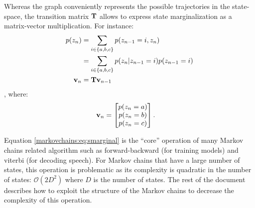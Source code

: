 Whereas the graph conveniently represents the possible trajectories in
the state-space, the transition matrix $\boldsymbol{\mathbf{T}}$ allows to express
state marginalization as a matrix-vector multiplication. For instance:
\begin{align}
    p(z_n) &= \sum_{i \in \{a, b, c\} } p(z_{n-1}=i, z_n) \\
    &= \sum_{i \in \{a, b, c\}} p(z_n | z_{n-1} = i) p(z_{n-1} = i) \\
    \boldsymbol{\mathbf{v}}_n &= \boldsymbol{\mathbf{T}} \boldsymbol{\mathbf{v}}_{n-1} \label{markovchains:eq:smarginal}
\end{align},
where:
\begin{align}
    \boldsymbol{\mathbf{v}}_n &= \begin{bmatrix}
        p(z_n = a) \\
        p(z_n = b) \\
        p(z_n = c)
\end{bmatrix}.
\end{align}

Equation \eqref{markovchains:eq:smarginal} is the ``core'' operation of many
Markov chains related algorithm such as forward-backward (for training models)
and viterbi (for decoding speech). For Markov chains that have a large number
of states, this operation is problematic as its complexity is quadratic in the
number of states: $\mathcal{O}(2D^2)$ where $D$ is the number of states.
The rest of the document describes how to exploit the structure of the Markov
chains to decrease the complexity of this operation.

